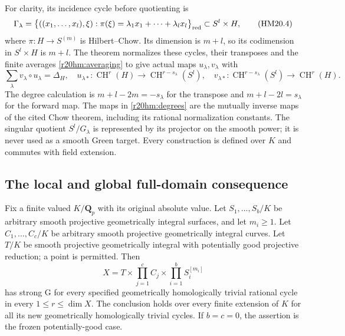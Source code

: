 For clarity, its incidence cycle before quotienting is
\[
 \Gamma_\lambda=
 \bigl\{((x_1,\ldots,x_l),\xi):
       \pi(\xi)=\lambda_1x_1+\cdots+\lambda_lx_l\bigr\}_{\rm red}
 \subset S^l\times H,
 \tag{HM20.4}\label{r20hm:incidence}
\]
where $\pi:H\to S^{(m)}$ is Hilbert--Chow.  Its dimension
is $m+l$, so its codimension in $S^l\times H$ is $m+l$.
The theorem normalizes these cycles, their transposes and
the finite averages \eqref{r20hm:averaging} to give actual
maps $u_\lambda,v_\lambda$ with
\[
 \sum_\lambda v_\lambda\circ u_\lambda=\Delta_H,
 \quad
 u_{\lambda*}:\operatorname{CH}^r(H)\longrightarrow
                  \operatorname{CH}^{r-s_\lambda}(S^l),
 \quad
 v_{\lambda*}:\operatorname{CH}^{r-s_\lambda}(S^l)
                    \longrightarrow\operatorname{CH}^r(H).
 \tag{HM20.5}\label{r20hm:degrees}
\]
The degree calculation is $m+l-2m=-s_\lambda$ for the
transpose and $m+l-2l=s_\lambda$ for the forward map.
The maps in \eqref{r20hm:degrees} are the mutually inverse
maps of the cited Chow theorem, including its rational
normalization constants.  The singular quotient
$S^l/G_\lambda$ is represented by its projector on the
smooth power; it is never used as a smooth Green target.
Every construction is defined over $K$ and commutes with
field extension.

\subsection{The local and global full-domain consequence}

\begin{theorem}
\label{r20hm:main}
Fix a finite valued $K/\mathbf Q_p$ with its original absolute value.
Let $S_1,\ldots,S_b/K$ be arbitrary smooth projective geometrically
integral surfaces, and let $m_i\geq1$.  Let $C_1,\ldots,C_c/K$
be arbitrary smooth projective geometrically integral curves.
Let $T/K$ be smooth projective geometrically integral with
potentially good projective reduction; a point is permitted.
Then
\[
 X=T\times\prod_{j=1}^{c}C_j\times
                    \prod_{i=1}^{b}S_i^{[m_i]}
 \tag{HM20.6}\label{r20hm:family}
\]
has strong G for every specified geometrically homologically
trivial rational cycle in every $1\leq r\leq\dim X$.
The conclusion holds over every finite extension of $K$ for
all its new geometrically homologically trivial cycles.
If $b=c=0$, the assertion is the frozen potentially-good case.
\end{theorem}

